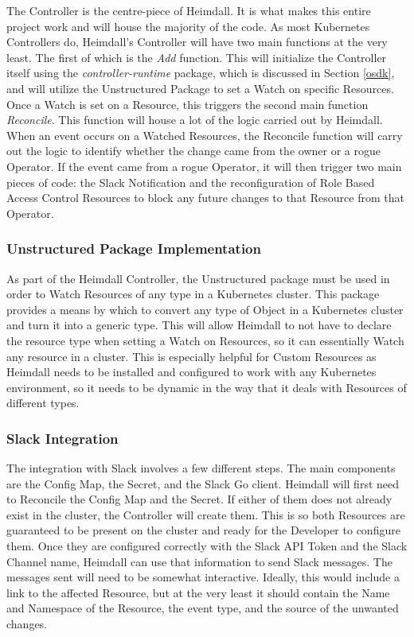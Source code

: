 \documentclass{article}
\begin{document}
The Controller is the centre-piece of Heimdall. It is what makes this entire project work and will house the majority of the code. As most Kubernetes Controllers do, Heimdall's Controller will have two main functions at the very least. The first of which is the \emph{Add} function. This will initialize the Controller itself using the \emph{controller-runtime} package, which is discussed in Section \ref{osdk}, and will utilize the Unstructured Package to set a Watch on specific Resources. Once a Watch is set on a Resource, this triggers the second main function \emph{Reconcile}. This function will house a lot of the logic carried out by Heimdall. When an event occurs on a Watched Resources, the Reconcile function will carry out the logic to identify whether the change came from the owner or a rogue Operator. If the event came from a rogue Operator, it will then trigger two main pieces of code: the Slack Notification and the reconfiguration of Role Based Access Control Resources to block any future changes to that Resource from that Operator.

\subsubsection{Unstructured Package Implementation}

As part of the Heimdall Controller, the Unstructured package must be used in order to Watch Resources of any type in a Kubernetes cluster. This package provides a means by which to convert any type of Object in a Kubernetes cluster and turn it into a generic type. This will allow Heimdall to not have to declare the resource type when setting a Watch on Resources, so it can essentially Watch any resource in a cluster. This is especially helpful for Custom Resources as Heimdall needs to be installed and configured to work with any Kubernetes environment, so it needs to be dynamic in the way that it deals with Resources of different types.

\subsubsection{Slack Integration}

The integration with Slack involves a few different steps. The main components are the Config Map, the Secret, and the Slack Go client. Heimdall will first need to Reconcile the Config Map and the Secret. If either of them does not already exist in the cluster, the Controller will create them. This is so both Resources are guaranteed to be present on the cluster and ready for the Developer to configure them. Once they are configured correctly with the Slack API Token and the Slack Channel name, Heimdall can use that information to send Slack messages. The messages sent will need to be somewhat interactive. Ideally, this would include a link to the affected Resource, but at the very least it should contain the Name and Namespace of the Resource, the event type, and the source of the unwanted changes.
\end{document}
